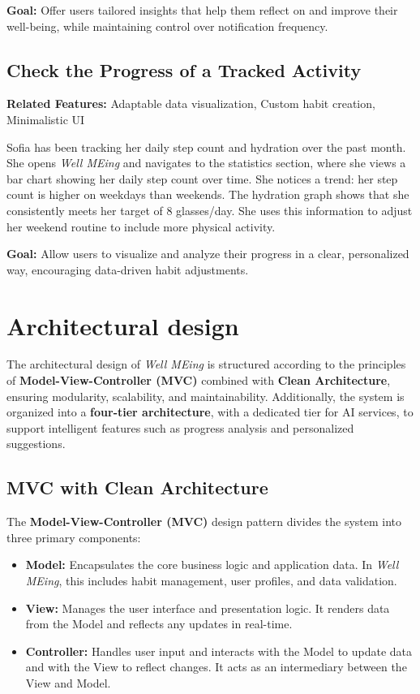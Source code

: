 \documentclass{article}
\begin{document}
\vspace{0.2cm}
\noindent
\textbf{Goal:} Offer users tailored insights that help them reflect on and improve their well-being, while maintaining control over notification frequency.

\subsection{Check the Progress of a Tracked Activity}

\textbf{Related Features:} Adaptable data visualization, Custom habit creation, Minimalistic UI

\vspace{0.3cm}
\noindent
Sofia has been tracking her daily step count and hydration over the past month. She opens \textit{Well MEing} and navigates to the statistics section, where she views a bar chart showing her daily step count over time. She notices a trend: her step count is higher on weekdays than weekends. The hydration graph shows that she consistently meets her target of 8 glasses/day. She uses this information to adjust her weekend routine to include more physical activity.

\vspace{0.2cm}
\noindent
\textbf{Goal:} Allow users to visualize and analyze their progress in a clear, personalized way, encouraging data-driven habit adjustments.

\section{Architectural design}

The architectural design of \textit{Well MEing} is structured according to the principles of \textbf{Model-View-Controller (MVC)} combined with \textbf{Clean Architecture}, ensuring modularity, scalability, and maintainability. Additionally, the system is organized into a \textbf{four-tier architecture}, with a dedicated tier for AI services, to support intelligent features such as progress analysis and personalized suggestions.

\subsection{MVC with Clean Architecture}

The \textbf{Model-View-Controller (MVC)} design pattern divides the system into three primary components:

\begin{itemize}
    \item \textbf{Model:} Encapsulates the core business logic and application data. In \textit{Well MEing}, this includes habit management, user profiles, and data validation.
    \item \textbf{View:} Manages the user interface and presentation logic. It renders data from the Model and reflects any updates in real-time.
    \item \textbf{Controller:} Handles user input and interacts with the Model to update data and with the View to reflect changes. It acts as an intermediary between the View and Model.
\end{itemize}
\end{document}
